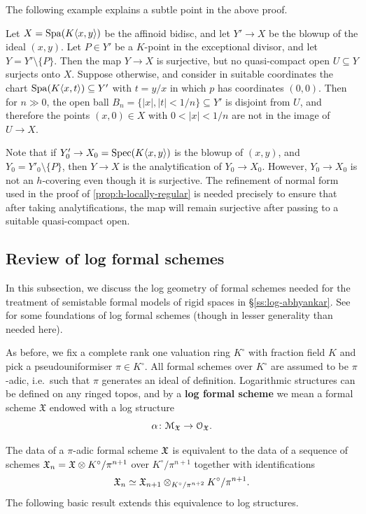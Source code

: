 The following example explains a subtle point in the above proof. 

\begin{ex}
Let $X = \operatorname{Spa}(K\langle x, y\rangle)$ be the affinoid bidisc, and let $Y'\to X$ be the blowup of the ideal $(x, y)$. Let $P \in Y'$ be a $K$-point in the exceptional divisor, and let $Y = Y'\setminus\{P\}$. Then the map $Y\to X$ is surjective, but no quasi-compact open $U\subseteq Y$ surjects onto $X$. Suppose otherwise, and consider in suitable coordinates the chart $\operatorname{Spa}(K\langle x,t\rangle)\subseteq Y'$ with $t=y/x$ in which $p$ has coordinates $(0,0)$. Then for $n\gg 0$, the open ball $B_n = \{|x|, |t|<1/n\}\subseteq Y'$ is disjoint from $U$, and therefore the points $(x,0) \in X$ with $0<|x|<1/n$ are not in the image of $U\to X$.  

Note that if $Y'_0\to X_0=\operatorname{Spec}(K\langle x, y\rangle)$ is the blowup of $(x,y)$, and $Y_0 = Y'_0\setminus\{P\}$, then $Y\to X$ is the analytification of $Y_0\to X_0$. However, $Y_0\to X_0$ is not an $h$-covering even though it is surjective. The refinement of normal form used in the proof of \cref{prop:h-locally-regular} is needed precisely to ensure that after taking analytifications, the map will remain surjective after passing to a suitable quasi-compact open.
\end{ex}

\subsection{Review of log formal schemes}
\label{ss:log-formal-schemes}

In this subsection, we discuss the log geometry of formal schemes needed for the treatment of semistable formal models of rigid spaces in \S\ref{ss:log-abhyankar}. See \cite[\S 7]{Fersi} for some foundations of log formal schemes (though in lesser generality than needed here).

As before, we fix a complete rank one valuation ring $K^\circ$ with fraction field $K$ and pick a pseudouniformiser $\pi\in K^\circ$. All formal schemes over $K^\circ$ are assumed to be $\pi$-adic, i.e.\ such that $\pi$ generates an ideal of definition. Logarithmic structures can be defined on any ringed topos, and by a {\bf log formal scheme} we mean a formal scheme $\mathfrak{X}$ endowed with a log structure 
\[
\alpha\colon{\mathcal M}_{\mathfrak{X}}\to{\mathcal O}_{\mathfrak{X}}.
\]

The data of a $\pi$-adic formal scheme ${\mathfrak{X}}$ is equivalent to the data of a sequence of schemes ${\mathfrak{X}}_n = {\mathfrak{X}}\otimes K^\circ/\pi^{n+1}$ over $K^\circ/\pi^{n+1}$ together with identifications
\[ 
    {\mathfrak{X}}_n \simeq {\mathfrak{X}}_{n+1} \otimes_{K^\circ/\pi^{n+2}} K^\circ/\pi^{n+1}.
\]
The following basic result extends this equivalence to log structures.

